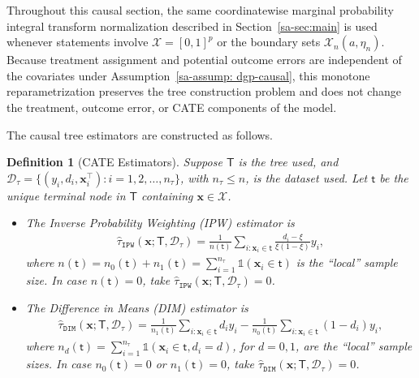 \documentclass[10pt]{article}
\def\treeT{\mathsf{T}}
\def\nodet{\mathsf{t}}
\def\bx{\mathbf{x}}
\def\X{\mathcal{X}}
\newcommand{\Indicator}{\mathds{1}}
\newtheorem{definition}{Definition}
\theoremstyle{definition}
\theoremstyle{remark}
\begin{document}
Throughout this causal section, the same coordinatewise marginal probability integral transform normalization described in Section~\ref{sa-sec:main} is used whenever statements involve $\mathcal{X}=[0,1]^p$ or the boundary sets $\mathcal{X}_n(a,\eta_n)$. Because treatment assignment and potential outcome errors are independent of the covariates under Assumption~\ref{sa-assump: dgp-causal}, this monotone reparametrization preserves the tree construction problem and does not change the treatment, outcome error, or CATE components of the model.

The causal tree estimators are constructed as follows.

\begin{definition}[CATE Estimators]\label{sa-defn: CATE Estimators}
    Suppose $\treeT$ is the tree used, and $\mathcal{D}_\tau=\{(y_i,d_i,\bx^\top_i):i=1,2,\dots,n_{\tau}\}$, with $n_{\tau}\leq n$, is the dataset used. Let $\nodet$ be the unique terminal node in $\treeT$ containing $\bx \in \X$.

    \begin{itemize}
        \item The \textit{Inverse Probability Weighting} (IPW) estimator is
        \begin{align*}
            \hat\tau_\mathtt{IPW}(\bx; \treeT,\mathcal{D}_\tau)
            = \frac{1}{n(\nodet)} \sum_{i:\bx_i \in \nodet} \frac{d_i-\xi}{\xi(1-\xi)} y_i,
        \end{align*}
        where $n(\nodet) = n_{0}(\nodet) + n_{1}(\nodet) = \sum_{i=1}^{n_{\tau}} \Indicator(\bx_i \in \nodet)$ is the ``local'' sample size. In case $n(\nodet) = 0$, take $\hat\tau_\mathtt{IPW}(\bx; \treeT,\mathcal{D}_\tau) = 0$.

        \item The \textit{Difference in Means} (DIM) estimator is
        \begin{align*}
            \hat\tau_\mathtt{DIM}(\bx; \treeT,\mathcal{D}_\tau)
            = \frac{1}{n_{1}(\nodet)} \sum_{i:\bx_i \in \nodet} d_i y_i 
            - \frac{1}{n_{0}(\nodet)} \sum_{i:\bx_i \in \nodet} (1-d_i) y_i,
        \end{align*}
        where $n_{d}(\nodet) = \sum_{i=1}^{n_{\tau}} \Indicator(\bx_i \in \nodet, d_i = d)$, for $d=0,1$, are the ``local'' sample sizes. In case $n_0(\nodet) = 0$ or $n_1(\nodet) = 0$, take $\hat\tau_\mathtt{DIM}(\bx; \treeT,\mathcal{D}_\tau) = 0$.
    \end{itemize}
\end{definition}
\end{document}
